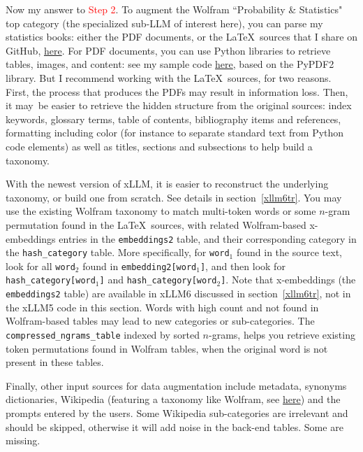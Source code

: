 \documentclass[oneside,10pt]{book}
\begin{document}
Now my answer to \textcolor{red}{Step 2}. To augment the Wolfram
``Probability \& Statistics" top category (the specialized sub-LLM of interest here),  you can parse my statistics books:
 either the PDF documents, or the \LaTeX \, sources that I share on GitHub, \href{https://github.com/VincentGranville/Large-Language-Models/tree/main/data_augmentation}{here}. For PDF documents, you can use Python libraries to retrieve tables, images, and content: 
 see my sample code \href{https://github.com/VincentGranville/Large-Language-Models/blob/main/data_augmentation/pdf.py}{here}, based on the 
\textcolor{index}{PyPDF2} library. But I recommend working with the \LaTeX \, sources, for two reasons. First, the process that
 produces the PDFs may result in information loss. Then, it may~be easier to retrieve the hidden structure from the original sources: index keywords, glossary terms, 
table of contents, bibliography items and references, formatting including color (for instance to separate standard text from Python code elements) as well as 
titles, sections and subsections to help build a taxonomy. 

With the newest version of xLLM, it is easier to reconstruct the underlying taxonomy, or build one from scratch. See details in section~\ref{xllm6tr}. You may use the existing Wolfram taxonomy
 to match multi-token words or some \textcolor{index}{$n$-gram} permutation found in the \LaTeX \, sources, with related Wolfram-based \textcolor{index}{x-embeddings} entries in the \texttt{embeddings2} table, and their corresponding category
 in the \texttt{hash\_category} table.  More specifically, for \texttt{word$_1$} found in the source text, look for all
 \texttt{word$_2$} found in \texttt{embedding2[word$_1$]}, and then look for 
\texttt{hash\_category[word$_1$]} and  \texttt{hash\_category[word$_2$]}. Note that x-embeddings (the \texttt{embeddings2} table) are available
 in xLLM6 discussed in section~\ref{xllm6tr}, not in the xLLM5 code in this section. Words with high count and not found in Wolfram-based tables may lead to new categories or sub-categories.  The \texttt{compressed\_ngrams\_table} indexed by sorted $n$-grams, helps you retrieve existing token permutations
 found in Wolfram tables, when the original word is not present in these tables.  

Finally, other input sources for data augmentation include metadata, synonyms dictionaries, Wikipedia (featuring a taxonomy like Wolfram, 
see \href{https://en.wikipedia.org/wiki/Category:Machine_learning}{here}) and the prompts entered by the users.
Some Wikipedia sub-categories are irrelevant and should be skipped, otherwise it will add noise in the back-end tables. Some are missing. 
\end{document}
